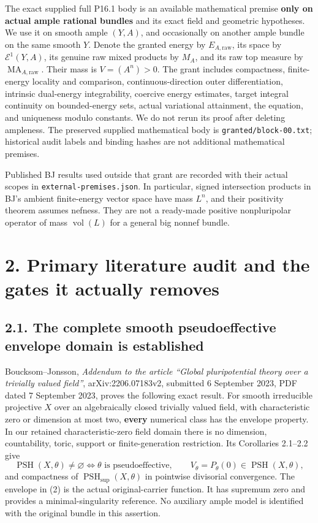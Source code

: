 \documentclass[
  10pt,
]{article}
\begin{document}
The exact supplied full P16.1 body is an available mathematical premise
\textbf{only on actual ample rational bundles} and its exact field and
geometric hypotheses. We use it on smooth ample \((Y,A)\), and
occasionally on another ample bundle on the same smooth \(Y\). Denote
the granted energy by \(E_{A,\mathrm{raw}}\), its space by
\(\mathcal E^1(Y,A)\), its genuine raw mixed products by \(M_A\), and
its raw top measure by \(\operatorname{MA}_{A,\mathrm{raw}}\). Their
mass is \(V=(A^n)>0\). The grant includes compactness, finite-energy
locality and comparison, continuous-direction outer differentiation,
intrinsic dual-energy integrability, coercive energy estimates, target
integral continuity on bounded-energy sets, actual variational
attainment, the equation, and uniqueness modulo constants. We do not
rerun its proof after deleting ampleness. The preserved supplied
mathematical body is \texttt{granted/block-00.txt}; historical audit
labels and binding hashes are not additional mathematical premises.

Published BJ results used outside that grant are recorded with their
actual scopes in \texttt{external-premises.json}. In particular, signed
intersection products in BJ's ambient finite-energy vector space have
mass \(L^n\), and their positivity theorem assumes nefness. They are not
a ready-made positive nonpluripolar operator of mass
\(\operatorname{vol}(L)\) for a general big nonnef bundle.

\section{2. Primary literature audit and the gates it actually
removes}\label{primary-literature-audit-and-the-gates-it-actually-removes}

\subsection{2.1. The complete smooth pseudoeffective envelope domain is
established}\label{the-complete-smooth-pseudoeffective-envelope-domain-is-established}

Boucksom--Jonsson, \emph{Addendum to the article ``Global pluripotential
theory over a trivially valued field''}, arXiv:2206.07183v2, submitted 6
September 2023, PDF dated 7 September 2023, proves the following exact
result. For smooth irreducible projective \(X\) over an algebraically
closed trivially valued field, with characteristic zero or dimension at
most two, \textbf{every} numerical class has the envelope property. In
our retained characteristic-zero field domain there is no dimension,
countability, toric, support or finite-generation restriction. Its
Corollaries 2.1--2.2 give \[
 \operatorname{PSH}(X,\theta)\ne\varnothing
 \Longleftrightarrow \theta\text{ is pseudoeffective},\qquad
 V_\theta=P_\theta(0)\in\operatorname{PSH}(X,\theta),
 \tag{2}
\] and compactness of \(\operatorname{PSH}_{\sup}(X,\theta)\) in
pointwise divisorial convergence. The envelope in (2) is the actual
original-carrier function. It has supremum zero and provides a
minimal-singularity reference. No auxiliary ample model is identified
with the original bundle in this assertion.
\end{document}
